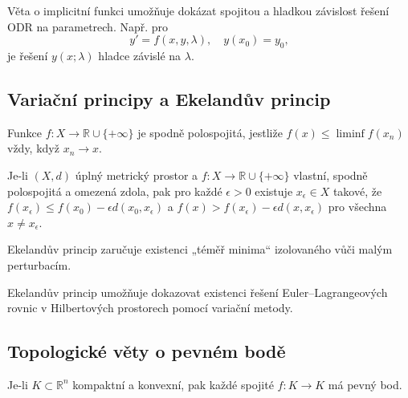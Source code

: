 \begin{example}
\label{ex:implicitni-dre}
Věta o implicitní funkci umožňuje dokázat spojitou a hladkou závislost řešení ODR na parametrech. Např. pro
\[
y' = f(x,y,\lambda), \quad y(x_0)=y_0,
\]
je řešení $y(x;\lambda)$ hladce závislé na $\lambda$.
\end{example}

\subsection{Variační principy a Ekelandův princip}
\label{sec:variacni-principy}

\begin{definition}
\label{def:spodni-polospojitost}
Funkce $f: X \to \mathbb{R}\cup\{+\infty\}$ je spodně polospojitá, jestliže $f(x) \leq \liminf f(x_n)$ vždy, když $x_n \to x$.
\end{definition}

\begin{theorem}
\label{vet:ekeland}
Je-li $(X,d)$ úplný metrický prostor a $f: X \to \mathbb{R}\cup\{+\infty\}$ vlastní, spodně polospojitá a omezená zdola, pak pro každé $\epsilon>0$ existuje $x_\epsilon\in X$ takové, že $f(x_\epsilon)\leq f(x_0)-\epsilon d(x_0,x_\epsilon)$ a $f(x)>f(x_\epsilon)-\epsilon d(x,x_\epsilon)$ pro všechna $x\neq x_\epsilon$.
\end{theorem}

\begin{remark}
Ekelandův princip zaručuje existenci „téměř minima“ izolovaného vůči malým perturbacím.
\end{remark}

\begin{example}
\label{ex:ekeland-dre}
Ekelandův princip umožňuje dokazovat existenci řešení Euler–Lagrangeových rovnic v Hilbertových prostorech pomocí variační metody.
\end{example}

\subsection{Topologické věty o pevném bodě}
\label{sec:topologicke-vety}

\begin{theorem}
\label{vet:brouwer}
Je-li $K\subset\mathbb{R}^n$ kompaktní a konvexní, pak každé spojité $f:K\to K$ má pevný bod.
\end{theorem}

